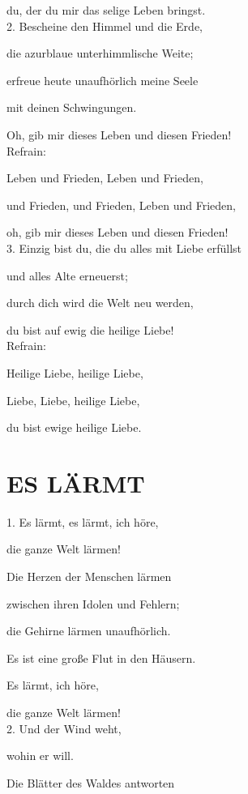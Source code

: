 \documentclass[11pt,a5paper,twoside]{article}
\begin{document}
du, der du mir das selige Leben bringst.\\ 


2. Bescheine den Himmel und die Erde,

die azurblaue unterhimmlische Weite; 

erfreue heute unaufhörlich meine Seele

mit deinen Schwingungen.

Oh, gib mir dieses Leben und diesen Frieden!\\

Refrain:

Leben und Frieden, Leben und Frieden,

und Frieden, und Frieden, Leben und Frieden,

oh, gib mir dieses Leben und diesen Frieden!\\


3. Einzig bist du, die du alles mit Liebe erfüllst 

und alles Alte erneuerst; 

durch dich wird die Welt neu werden, 

du bist auf ewig die heilige Liebe!\\

Refrain:

Heilige Liebe, heilige Liebe,

Liebe, Liebe, heilige Liebe,

du bist ewige heilige Liebe.\\

\section[Es lärmt]{ES LÄRMT}

1. Es lärmt, es lärmt, ich höre,

die ganze Welt lärmen! 

Die Herzen der Menschen lärmen 

zwischen ihren Idolen und Fehlern; 

die Gehirne lärmen unaufhörlich. 

Es ist eine große Flut in den Häusern. 

Es lärmt, ich höre,
 
die ganze Welt lärmen!\\


2. Und der Wind weht, 

wohin er will. 

Die Blätter des Waldes antworten 
\end{document}
